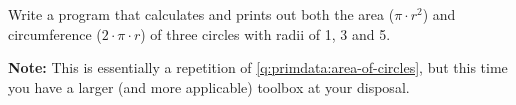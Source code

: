 Write a program that calculates and prints out both the area  ($\pi \cdot r^2$) and circumference ($2 \cdot \pi \cdot r$) of three circles with radii of 1, 3 and 5.

\textbf{Note:} This is essentially a repetition of \ref{q:primdata:area-of-circles}, but this time you have a larger (and more applicable) toolbox at your disposal.

